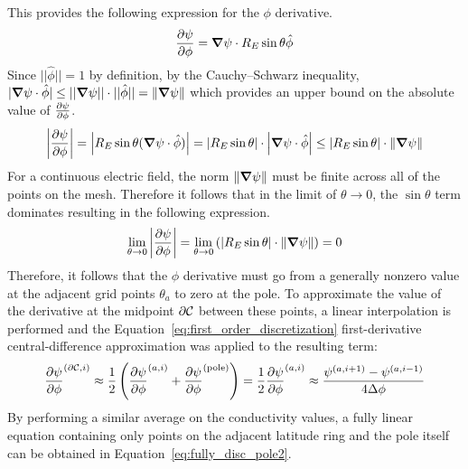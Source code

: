 This provides the following expression for the $\phi$ derivative.
\begin{equation*}
	\pdv{\psi}{\phi} = \bm\nabla\psi \cdot R_E\sin\theta\hat\phi
\end{equation*}
Since $||\hat\phi|| = 1$ by definition, by the Cauchy–Schwarz inequality, $|\bm\nabla\psi \cdot \hat\phi| \le ||\bm\nabla\psi||\cdot  ||\hat\phi||= \norm{\bm\nabla\psi}$ which provides an upper bound on the absolute value of $\pdv{\psi}{\phi}$.
\begin{equation*}
	\abs{\pdv{\psi}{\phi}} = \abs{R_E\sin\theta (\bm\nabla\psi\cdot\hat\phi)}=\abs{R_E\sin\theta}\cdot \abs{\bm\nabla\psi\cdot \hat\phi} \le \abs{R_E\sin\theta}\cdot \norm{\bm\nabla\psi}
\end{equation*}
For a continuous electric field, the norm $\norm{\bm\nabla\psi}$ must be finite across all of the points on the mesh. Therefore it follows that in the limit of $\theta\rightarrow0$, the $\sin\theta$ term dominates resulting in the following expression.
\begin{equation*}
	\lim_{\theta\rightarrow0}\left|\pdv{\psi}{\phi}\right| = \lim_{\theta\rightarrow0} \left(\abs{R_E\sin\theta}\cdot \norm{\bm\nabla\psi}\right) = 0
\end{equation*}
Therefore, it follows that the $\phi$ derivative must go from a generally nonzero value at the adjacent grid points $\theta_a$ to zero at the pole. To approximate the value of the derivative at the midpoint $\partial\mathcal{C}$ between these points, a linear interpolation is performed and the Equation~\ref{eq:first_order_discretization} first-derivative central-difference approximation was applied to the resulting term:
\begin{equation}
	\frac{\partial \psi}{\partial \phi}^{(\partial\mathcal{C},i)}
	\approx \frac{1}{2}\left(\pdv{\psi}{\phi}^{(a, i)} + \pdv{\psi}{\phi}^{(\rm pole)} \right) = \frac12\pdv{\psi}{\phi}^{(a,i)}
	\approx \frac{\psi^{(a, i+1)} - \psi^{(a, i-1)}}{4\Delta \phi}
\end{equation}
By performing a similar average on the conductivity values, a fully linear equation containing only points on the adjacent latitude ring and the pole itself can be obtained in Equation~\ref{eq:fully_disc_pole2}.

